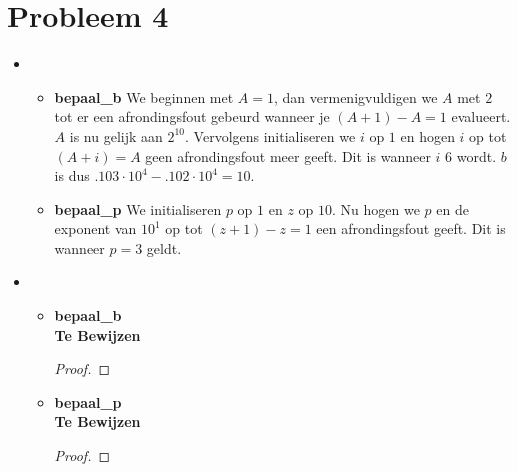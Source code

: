 \documentclass[12pt,a4paper]{article}
\begin{document}
\section{Probleem 4}
\begin{itemize}
\item
\begin{itemize}
\item \textbf{bepaal\_b}
We beginnen met $A=1$, dan vermenigvuldigen we $A$ met $2$ tot er een afrondingsfout gebeurd wanneer je $(A+1)-A=1$ evalueert. 
$A$ is nu gelijk aan $2^{10}$. Vervolgens initialiseren we $i$ op $1$ en hogen $i$ op tot $(A+i)=A$ geen afrondingsfout meer geeft. Dit is wanneer $i$ $6$ wordt. $b$ is dus $.103\cdot 10^4-.102\cdot 10^4=10$.
\item \textbf{bepaal\_p}
We initialiseren $p$ op $1$ en $z$ op $10$. Nu hogen we $p$ en de exponent van $10^1$ op tot $(z+1)-z=1$ een afrondingsfout geeft.
Dit is wanneer $p=3$ geldt. 
\end{itemize}
\item
\begin{itemize}
\item \textbf{bepaal\_b}\\
\textbf{Te Bewijzen}
\begin{proof}
\end{proof}
\item \textbf{bepaal\_p}\\
\textbf{Te Bewijzen}
\begin{proof}
\end{proof}
\end{itemize}
\end{itemize}
\end{document}

